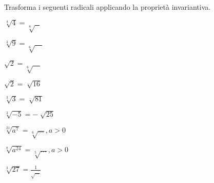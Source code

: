 \subsubsection*{}

\begin{esercizio}
 \label{ese:2.21}
Trasforma i seguenti radicali applicando la proprietà invariantiva.
\vspace{-.5em}
 \begin{multicols}{3}
 \begin{enumeratea}
 \item $\sqrt[4]4=\sqrt[8]{\text{   }}$
 \item $\sqrt[3]9=\sqrt[6]{\quad}$
 \item $\sqrt 2=\sqrt[6]{\quad}$
 \item $\sqrt 2=\sqrt[\dots]{16}$
 \item $\sqrt[3]3=\sqrt[\dots]{81}$
 \item $\sqrt[3]{-5}=-\sqrt[\ldots]{25}$
 \item $\sqrt[21]{a^7}=\sqrt[6]{\ldots}, a>0$
 \item $\sqrt[8]{a^{24}}=\sqrt[5]{\ldots}, a>0$
 \item $\sqrt[3]{27}=\frac 1{\sqrt{\ldots}}$
 \end{enumeratea}
 \end{multicols}
\end{esercizio}


